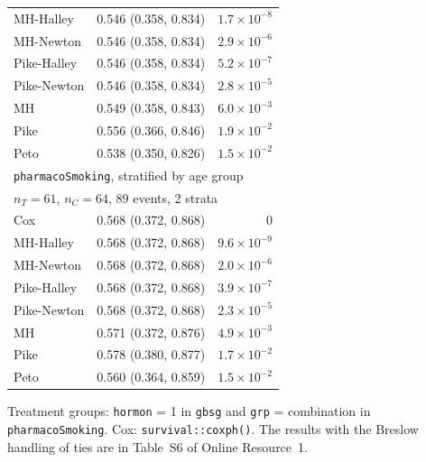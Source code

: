 \begin{table}
\begin{tabular}{llr}
MH-Halley & 0.546 (0.358, 0.834) & $1.7 \times 10^{-8}$ \\
MH-Newton & 0.546 (0.358, 0.834) & $2.9 \times 10^{-6}$ \\
Pike-Halley & 0.546 (0.358, 0.834) & $5.2 \times 10^{-7}$ \\
Pike-Newton & 0.546 (0.358, 0.834) & $2.8 \times 10^{-5}$ \\
MH & 0.549 (0.358, 0.843) & $6.0 \times 10^{-3}$ \\
Pike & 0.556 (0.366, 0.846) & $1.9 \times 10^{-2}$ \\
Peto & 0.538 (0.350, 0.826) & $1.5 \times 10^{-2}$ \\
\midrule
\multicolumn{3}{l}{\texttt{pharmacoSmoking}, stratified by age group} \\
\multicolumn{3}{l}{$n_T = 61$, $n_C = 64$, 89 events, 2 strata} \\
Cox & 0.568 (0.372, 0.868) & $0$ \\
MH-Halley & 0.568 (0.372, 0.868) & $9.6 \times 10^{-9}$ \\
MH-Newton & 0.568 (0.372, 0.868) & $2.0 \times 10^{-6}$ \\
Pike-Halley & 0.568 (0.372, 0.868) & $3.9 \times 10^{-7}$ \\
Pike-Newton & 0.568 (0.372, 0.868) & $2.3 \times 10^{-5}$ \\
MH & 0.571 (0.372, 0.876) & $4.9 \times 10^{-3}$ \\
Pike & 0.578 (0.380, 0.877) & $1.7 \times 10^{-2}$ \\
Peto & 0.560 (0.364, 0.859) & $1.5 \times 10^{-2}$ \\
\bottomrule
\end{tabular}
\par\smallskip
{\footnotesize Treatment groups: \texttt{hormon} = 1 in \texttt{gbsg} and \texttt{grp} = combination in \texttt{pharmacoSmoking}. Cox: \texttt{survival::coxph()}. The results with the Breslow handling of ties are in Table~S6 of Online Resource~1.\par}
\end{table}

